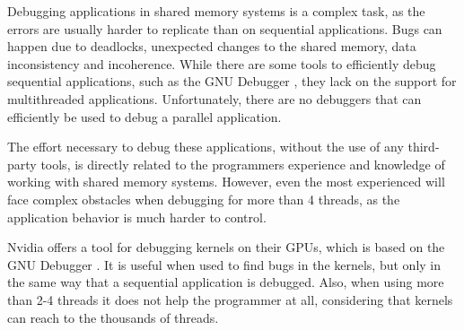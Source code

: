 Debugging applications in shared memory systems is a complex task, as the errors are usually harder to replicate than on sequential applications. Bugs can happen due to deadlocks, unexpected changes to the shared memory, data inconsistency and incoherence. While there are some tools to efficiently debug sequential applications, such as the GNU Debugger \cite{GDB}, they lack on the support for multithreaded applications. Unfortunately, there are no debuggers that can efficiently be used to debug a parallel application.

The effort necessary to debug these applications, without the use of any third-party tools, is directly related to the programmers experience and knowledge of working with shared memory systems. However, even the most experienced will face complex obstacles when debugging for more than 4 threads, as the application behavior is much harder to control.

Nvidia offers a tool for debugging \cuda kernels on their GPUs, which is based on the GNU Debugger \cite{NVIDIA:gdb}. It is useful when used to find bugs in the kernels, but only in the same way that a sequential application is debugged. Also, when using more than 2-4 \cuda threads it does not help the programmer at all, considering that \cuda kernels can reach to the thousands of threads.

\newpage
